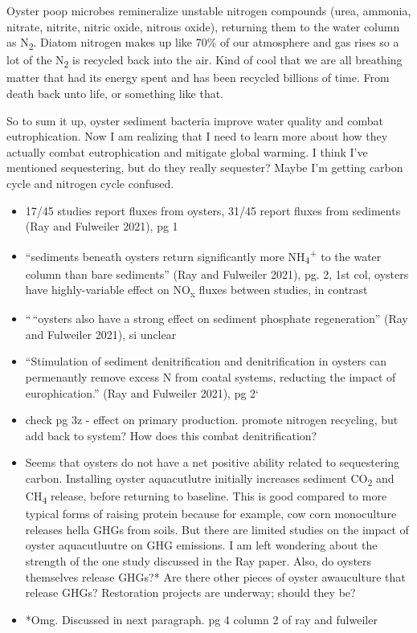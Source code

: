 \documentclass[
  11pt,
]{article}
\begin{document}
Oyster poop microbes remineralize unstable nitrogen compounds (urea,
ammonia, nitrate, nitrite, nitric oxide, nitrous oxide), returning them
to the water column as N\textsubscript{2}. Diatom nitrogen makes up like
70\% of our atmosphere and gas rises so a lot of the N\textsubscript{2}
is recycled back into the air. Kind of cool that we are all breathing
matter that had its energy spent and has been recycled billions of time.
From death back unto life, or something like that.

So to sum it up, oyster sediment bacteria improve water quality and
combat eutrophication. Now I am realizing that I need to learn more
about how they actually combat eutrophication and mitigate global
warming. I think I've mentioned sequestering, but do they really
sequester? Maybe I'm getting carbon cycle and nitrogen cycle confused.

\begin{itemize}
\item
  17/45 studies report fluxes from oysters, 31/45 report fluxes from
  sediments (Ray and Fulweiler 2021), pg 1
\item
  ``sediments beneath oysters return significantly more
  NH\textsubscript{4}\textsuperscript{+} to the water column than bare
  sediments'' (Ray and Fulweiler 2021), pg. 2, 1st col, oysters have
  highly-variable effect on NO\textsubscript{x} fluxes between studies,
  in contrast
\item
  ``\,``oysters also have a strong effect on sediment phosphate
  regeneration'' (Ray and Fulweiler 2021), si unclear
\item
  ``Stimulation of sediment denitrification and denitrification in
  oysters can permenantly remove excess N from coatal systems, reducting
  the impact of europhication.'' (Ray and Fulweiler 2021), pg 2`
\item
  check pg 3z - effect on primary production. promote nitrogen
  recycling, but add back to system? How does this combat
  denitrification?
\item
  Seems that oysters do not have a net positive ability related to
  sequestering carbon. Installing oyster aquacutlutre initially
  increases sediment CO\textsubscript{2} and CH\textsubscript{4}
  release, before returning to baseline. This is good compared to more
  typical forms of raising protein because for example, cow corn
  monoculture releases hella GHGs from soils. But there are limited
  studies on the impact of oyster aquacutluutre on GHG emissions. I am
  left wondering about the strength of the one study discussed in the
  Ray paper. Also, do oysters themselves release GHGs?* Are there other
  pieces of oyster awauculture that release GHGs? Restoration projects
  are underway; should they be?
\item
  *Omg. Discussed in next paragraph. pg 4 column 2 of ray and fulweiler
\end{itemize}
\end{document}
